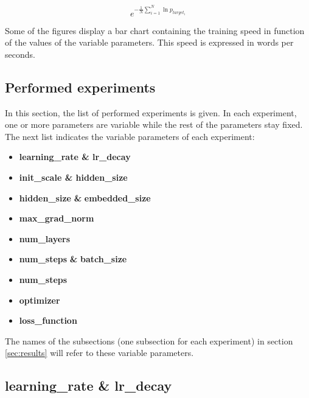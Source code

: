 \documentclass[10pt,a4paper,titlepage]{article}
\begin{document}
\[ e^{-\frac{1}{N} \sum_{i=1}^{N} \ln p_{target_{i}}} \]

\noindent
Some of the figures display a bar chart containing the training speed in function of the values of the variable parameters. This speed is expressed in words per seconds.

\subsection{Performed experiments}
\label{subsec:perf}

In this section, the list of performed experiments is given. In each experiment, one or more parameters are variable while the rest of the parameters stay fixed. The next list indicates the variable parameters of each experiment:

\begin{itemize}
	
	\item \textbf{learning\_rate \& lr\_decay}
	\item \textbf{init\_scale \& hidden\_size}
	\item \textbf{hidden\_size} \textbf{\&} \textbf{embedded\_size}
	\item \textbf{max\_grad\_norm}
	\item \textbf{num\_layers}
	\item \textbf{num\_steps} \textbf{\&} \textbf{batch\_size}
	\item \textbf{num\_steps}
	\item \textbf{optimizer}
	\item \textbf{loss\_function}
	
\end{itemize}

\noindent
The names of the subsections (one subsection for each experiment) in section \ref{sec:results} will refer to these variable parameters.

\subsection{learning\_rate \& lr\_decay}
\end{document}
